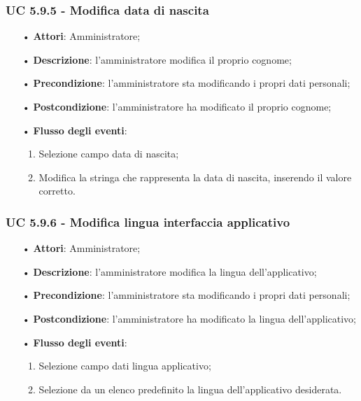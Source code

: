 \subsubsection{UC 5.9.5 - Modifica data di nascita}
\begin{itemize}
	\item[•]\textbf{Attori}: Amministratore;
	\item[•]\textbf{Descrizione}: l'amministratore modifica il proprio cognome;
	\item[•]\textbf{Precondizione}: l'amministratore sta modificando i propri dati personali;
	\item[•]\textbf{Postcondizione}: l'amministratore ha modificato il proprio cognome; 
	\item[•]\textbf{Flusso degli eventi}: 
	\begin{enumerate}
		\item Selezione campo data di nascita;
		\item Modifica la stringa che rappresenta la data di nascita, inserendo il valore corretto.
	\end{enumerate}
\end{itemize}
\subsubsection{UC 5.9.6 - Modifica lingua interfaccia applicativo}
\begin{itemize}
	\item[•]\textbf{Attori}: Amministratore;
	\item[•]\textbf{Descrizione}: l'amministratore modifica la lingua dell'applicativo;
	\item[•]\textbf{Precondizione}: l'amministratore sta modificando i propri dati personali;
	\item[•]\textbf{Postcondizione}: l'amministratore ha modificato la lingua dell'applicativo; 
	\item[•]\textbf{Flusso degli eventi}: 
	\begin{enumerate}
		\item Selezione campo dati lingua applicativo;
		\item Selezione da un elenco predefinito la lingua dell'applicativo desiderata.
	\end{enumerate}
\end{itemize}

